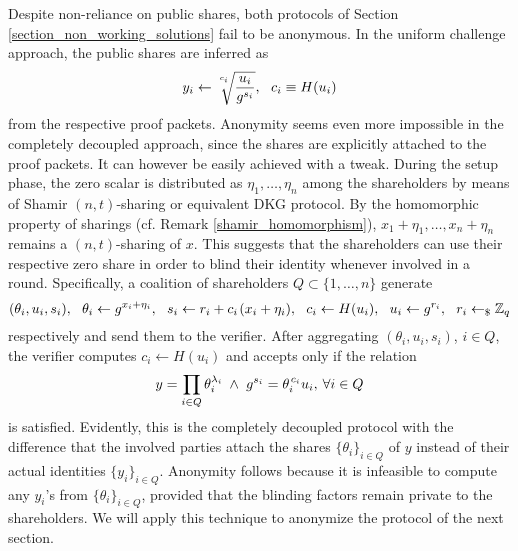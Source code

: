 \documentclass[psamsfonts, reqno]{amsart}
\theoremstyle{definition}
\theoremstyle{remark}
\numberwithin{equation}{section}
\begin{document}
Despite non-reliance on public shares,
both protocols of Section \ref{section_non_working_solutions}
fail to be anonymous.
In the uniform challenge approach,
the public shares are inferred as
\vspace{5pt}
\begin{equation*}
y_i \leftarrow
\sqrt[\leftroot{0}\uproot{10}c_i]{\frac{u_i}{g ^ {s_i}}},
\ \ c_i \equiv H(u_i)
\vspace{5pt}
\end{equation*}
from the respective proof packets.
Anonymity seems even more impossible in the completely decoupled approach,
since the shares are explicitly attached to the proof packets.
It can however be easily achieved with a tweak.
During the setup phase,
the zero scalar is distributed
as $\eta_1, \dots, \eta_n$ among the shareholders
by means of Shamir $(n, t)$-sharing or equivalent DKG protocol.
By the homomorphic property of sharings
(cf. Remark \ref{shamir_homomorphism}),
$x_1 + \eta_1, \dots, x_n + \eta_n$
remains a $(n, t)$-sharing of $x$.
This suggests that the shareholders can use their respective
zero share in order to blind their identity whenever involved
in a round.
Specifically,
a coalition of shareholders $Q \subset \{1, \dots, n\}$
generate
\vspace{5pt}
\begin{equation*}
(\theta_i, u_i, s_i),
\ \ \theta_i \leftarrow g ^ {x_i + \eta_i},
\ \ s_i \leftarrow r_i + c_i\hspace{1pt}(x_i + \eta_i),
\ \ c_i \leftarrow H(u_i),
\ \ u_i \leftarrow g ^ {r_i},
\ \ r_i \leftarrow_\$ \mathbb{Z}_q
\vspace{5pt}
\end{equation*}
respectively and send them to the verifier.
After aggregating $(\theta_i, u_i, s_i)$, $i \in Q$,
the verifier computes $c_i \leftarrow H(u_i)$
and accepts only if the relation
\vspace{5pt}
\begin{equation*}\label{intro_anon_verification}
y = \prod_{i \in Q} \theta_i ^{\lambda_i}
\hspace{2.50pt}
\land
\hspace{3pt}
g ^ {s_i} = \theta_i ^ {\hspace{1pt}c_i} u_i,
\hspace{2pt}
\forall i \in Q
\vspace{5pt}
\end{equation*}
is satisfied. Evidently,
this is the completely decoupled protocol
with the difference that the involved parties
attach the shares $\{\theta_i\}_{i \in Q}$ of $y$
instead of their actual identities $\{y_i\}_{i \in Q}$.
Anonymity follows because it is infeasible
to compute any
$y_i$'s from $\{\theta_i\}_{i \in Q}$,
provided that the blinding factors
remain private to the shareholders.
We will apply this technique to anonymize the protocol
of the next section.
\end{document}
